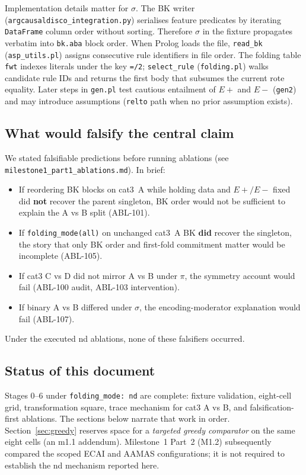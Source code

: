 \documentclass[11pt,a4paper]{article}
\begin{document}
Implementation details matter for $\sigma$. The BK writer
(\texttt{argcausaldisco\_integration.py}) serialises feature predicates by iterating
\texttt{DataFrame} column order without sorting. Therefore $\sigma$ in the fixture propagates
verbatim into \texttt{bk.aba} block order. When Prolog loads the file, \texttt{read\_bk}
(\texttt{asp\_utils.pl}) assigns consecutive rule identifiers in file order. The folding table
\texttt{fwt} indexes literals under the key \texttt{=/2}; \texttt{select\_rule}
(\texttt{folding.pl}) walks candidate rule IDs and returns the first body that subsumes the
current rote equality. Later steps in \texttt{gen.pl} test cautious entailment of $E+$ and $E-$
(\texttt{gen2}) and may introduce assumptions (\texttt{relto} path when no prior assumption
exists).

\subsection{What would falsify the central claim}

We stated falsifiable predictions before running ablations (see
\texttt{milestone1\_part1\_ablations.md}). In brief:

\begin{itemize}
  \item If reordering BK blocks on cat3~A while holding data and $E+/E-$ fixed did \textbf{not}
  recover the parent singleton, BK order would not be sufficient to explain the A vs B split
  (ABL-101).
  \item If \texttt{folding\_mode(all)} on unchanged cat3~A BK \textbf{did} recover the singleton,
  the story that only BK order and first-fold commitment matter would be incomplete (ABL-105).
  \item If cat3 C vs D did not mirror A vs B under $\pi$, the symmetry account would fail
  (ABL-100 audit, ABL-103 intervention).
  \item If binary A vs B differed under $\sigma$, the encoding-moderator explanation would fail
  (ABL-107).
\end{itemize}

Under the executed nd ablations, none of these falsifiers occurred.

\subsection{Status of this document}

Stages 0--6 under \texttt{folding\_mode: nd} are complete: fixture validation, eight-cell grid,
transformation square, trace mechanism for cat3 A vs B, and falsification-first ablations. The
sections below narrate that work in order. Section~\ref{sec:greedy} reserves space for a
\emph{targeted greedy comparator} on the same eight cells (an m1.1 addendum). Milestone~1
Part~2 (M1.2) subsequently compared the scoped ECAI and AAMAS configurations; it is not
required to establish the nd mechanism reported here.
\end{document}

